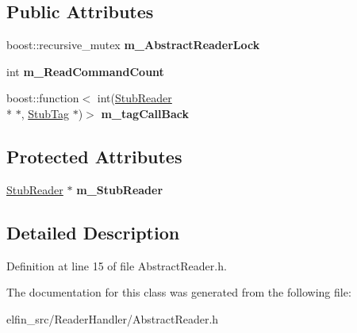 \subsection*{Public Attributes}
\begin{DoxyCompactItemize}
\item 
\hypertarget{class_e_l_f_i_n_1_1_abstract_reader_ac66092c17c0c8ab77e9112d47dfddd1c}{boost\-::recursive\-\_\-mutex {\bfseries m\-\_\-\-Abstract\-Reader\-Lock}}\label{class_e_l_f_i_n_1_1_abstract_reader_ac66092c17c0c8ab77e9112d47dfddd1c}

\item 
\hypertarget{class_e_l_f_i_n_1_1_abstract_reader_a07ce3410eb4612dc3bcda179f0b1ac3c}{int {\bfseries m\-\_\-\-Read\-Command\-Count}}\label{class_e_l_f_i_n_1_1_abstract_reader_a07ce3410eb4612dc3bcda179f0b1ac3c}

\item 
\hypertarget{class_e_l_f_i_n_1_1_abstract_reader_a73c8d1e5ec82d59ec8dd484dfd872e8c}{boost\-::function$<$ int(\hyperlink{class_e_l_f_i_n_1_1_stub_reader}{Stub\-Reader} \\*
$\ast$, \hyperlink{class_e_l_f_i_n_1_1_stub_tag}{Stub\-Tag} $\ast$)$>$ {\bfseries m\-\_\-tag\-Call\-Back}}\label{class_e_l_f_i_n_1_1_abstract_reader_a73c8d1e5ec82d59ec8dd484dfd872e8c}

\end{DoxyCompactItemize}
\subsection*{Protected Attributes}
\begin{DoxyCompactItemize}
\item 
\hypertarget{class_e_l_f_i_n_1_1_abstract_reader_aa1de5d53b34213146ea82b150e6c740b}{\hyperlink{class_e_l_f_i_n_1_1_stub_reader}{Stub\-Reader} $\ast$ {\bfseries m\-\_\-\-Stub\-Reader}}\label{class_e_l_f_i_n_1_1_abstract_reader_aa1de5d53b34213146ea82b150e6c740b}

\end{DoxyCompactItemize}


\subsection{Detailed Description}


Definition at line 15 of file Abstract\-Reader.\-h.



The documentation for this class was generated from the following file\-:\begin{DoxyCompactItemize}
\item 
elfin\-\_\-src/\-Reader\-Handler/Abstract\-Reader.\-h\end{DoxyCompactItemize}
